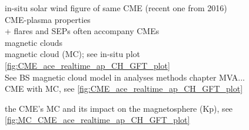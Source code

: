 in-situ solar wind figure of same CME (recent one from 2016)\\

CME-plasma properties\\
+ flares and SEPs often accompany CMEs\\

magnetic clouds\\
magnetic cloud (MC); see in-situ plot \autoref{fig:CME_ace_realtime_ap_CH_GFT_plot}\\
See BS magnetic cloud model in analyses methods chapter
MVA...\\

CME with MC, see \autoref{fig:CME_ace_realtime_ap_CH_GFT_plot}\\
\begin{figure}[htb]
\end{figure}

the CME's MC and its impact on the magnetosphere (Kp), see \autoref{fig:MC_CME_ace_realtime_ap_CH_GFT_plot}\\
\begin{figure}[htb]
\end{figure}

